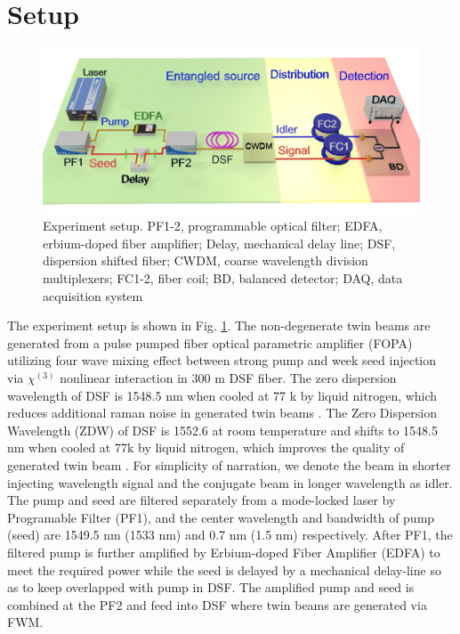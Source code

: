 \documentclass[9pt,twocolumn,twoside]{osajnl}
\begin{document}
\section{Setup}

\begin{figure}[htbp]
\centering
\includegraphics[width=\linewidth]{fig1_3d_2.jpg}
\caption{Experiment setup.
PF1-2, programmable optical filter;
EDFA, erbium-doped fiber amplifier;
Delay, mechanical delay line;
DSF, dispersion shifted fiber;
CWDM, coarse wavelength division multiplexers;
FC1-2, fiber coil;
BD, balanced detector;
DAQ, data acquisition system}
\label{fig_setup}

\end{figure}
The experiment setup is shown in Fig. \ref{fig_setup}.
The non-degenerate twin beams are generated from a pulse pumped fiber optical parametric amplifier (FOPA) utilizing four wave mixing effect between strong pump and week seed injection via \(\chi^{(3)} \) nonlinear interaction in 300 m DSF fiber.
The zero dispersion wavelength of DSF is 1548.5 nm when cooled at 77 k by liquid nitrogen, which reduces additional raman noise in generated twin beams \cite{guo12}.
The Zero Dispersion Wavelength (ZDW) of DSF is 1552.6 at room temperature and shifts to 1548.5 nm when cooled at 77k by liquid nitrogen, which improves the quality of generated twin beam \cite{guo12}.
For simplicity of narration, we denote the beam in shorter injecting wavelength signal and the conjugate beam in longer wavelength as idler.
The pump and seed are filtered separately from a mode-locked laser by Programable Filter (PF1), and the center wavelength and bandwidth of pump (seed) are 1549.5 nm (1533 nm) and 0.7 nm (1.5 nm) respectively.
After PF1, the filtered pump is further amplified by Erbium-doped Fiber Amplifier (EDFA) to meet the required power while the seed is delayed by a mechanical delay-line so as to keep overlapped with pump in DSF.
The amplified pump and seed is combined at the PF2 and feed into DSF where twin beams are generated via FWM.
\end{document}

